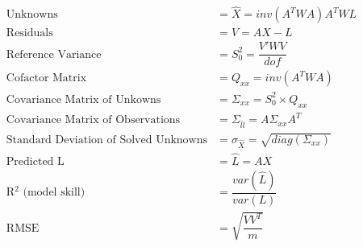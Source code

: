 \begin{align*}
	\text{Unknowns} &= \hat{X} = inv(A^TWA)A^TWL\\
	\text{Residuals} &= V = AX - L\\
	\text{Reference Variance} &= S_0^2 = \dfrac{V'WV}{dof} \\
	\text{Cofactor Matrix} &= Q_{xx} = inv(A^TWA) \\
	\text{Covariance Matrix of Unkowns} &= \Sigma_{xx} = S_0^2 \times Q_{xx} \\
	\text{Covariance Matrix of Observations} &= \Sigma_{\hat{l}\hat{l}} = A \Sigma_{xx} A^T \\
	\text{Standard Deviation of Solved Unknowns} &= \sigma_{\hat{X}} = \sqrt{diag(\Sigma_{xx})} \\
	\text{Predicted L} &= \hat{L} = AX \\
	\text{R$^2$ (model skill)} &= \dfrac{var(\hat{L})}{var(L)} \\
	\text{RMSE } &= \sqrt{\dfrac{VV^T}{m}} \\
\end{align*}
\clearpage
